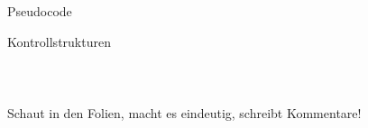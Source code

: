 \begin{frame}{Pseudocode}
\begin{block}{Kontrollstrukturen}
\begin{columns}
\begin{column}{0.45\textwidth}
\begin{tabular}[t]{ll}
   			\end{tabular}
		\end{column}
	\end{columns}

	Schaut in den Folien, macht es eindeutig, schreibt Kommentare!
\end{block}
    


\end{frame}